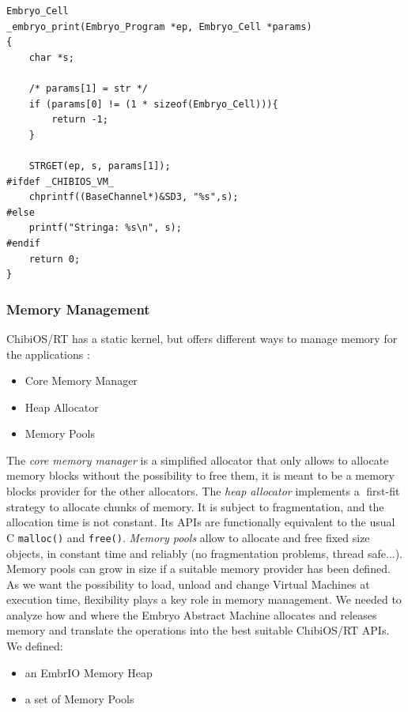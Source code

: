 \documentclass[a4paper,10pt]{article}
\begin{document}
\begin{multicols}{2}
\begin{lstlisting}[caption={Native function \textit{print}}]
Embryo_Cell
_embryo_print(Embryo_Program *ep, Embryo_Cell *params)
{
	char *s;

	/* params[1] = str */
	if (params[0] != (1 * sizeof(Embryo_Cell))){
		return -1;
	}

	STRGET(ep, s, params[1]);
#ifdef _CHIBIOS_VM_
	chprintf((BaseChannel*)&SD3, "%s",s);
#else
	printf("Stringa: %s\n", s);
#endif
	return 0;
}
\end{lstlisting}

\subsubsection{Memory Management}
\label{sec:mm}
ChibiOS/RT has a static kernel, but offers different ways to manage memory for the applications \cite{chMem}:

\begin{itemize}
\item Core Memory Manager
\item Heap Allocator
\item Memory Pools
\end{itemize}

The \textit{core memory manager} is a simplified allocator that only allows to allocate memory blocks without the possibility to free them, it is meant to be a memory blocks provider for the other allocators.\newline
The \textit{heap allocator} implements a first-fit strategy to allocate chunks of memory. It is subject to fragmentation, and the allocation time is not constant. Its APIs are functionally equivalent to the usual C \texttt{malloc()} and \texttt{free()}.\newline
\textit{Memory pools} allow to allocate and free fixed size objects, in constant time and reliably (no fragmentation problems, thread safe...). Memory pools can grow in size if a suitable memory provider has been defined.
As we want the possibility to load, unload and change Virtual Machines at execution time, flexibility plays a key role in memory management. We needed to analyze how and where the Embryo Abstract Machine allocates and releases memory and translate the operations into the best suitable ChibiOS/RT APIs.\newline
\bigskip
We defined:

\begin{itemize}
\item an EmbrIO Memory Heap
\item a set of Memory Pools
\end{itemize}


\end{multicols}
\end{document}
